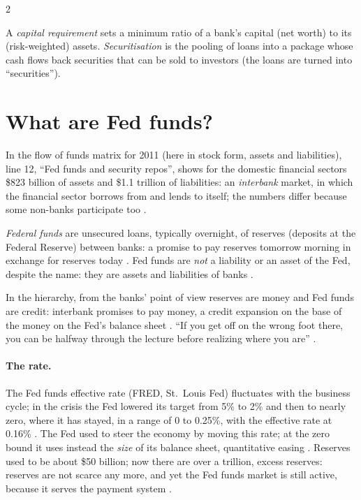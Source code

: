 \begin{paracol}{2}
\begin{definition}
A \emph{capital requirement} sets a minimum ratio of a bank's capital (net worth) to its (risk-weighted) assets. \emph{Securitisation} is the pooling
of loans into a package whose cash flows back securities that can be sold to investors (the loans are turned into ``securities'').
\end{definition}

\section{What are Fed funds?}\label{sec:ff-what}

In the flow of funds matrix for 2011 (here in stock form, assets and liabilities), line 12, ``Fed funds and security repos'', shows for the
domestic financial sectors \$823 billion of assets and \$1.1 trillion of liabilities: an \emph{interbank} market, in which the financial sector
borrows from and lends to itself; the numbers differ because some non-banks participate too .

\begin{definition}\label{def:ff}
\emph{Federal funds} are unsecured loans, typically overnight, of reserves (deposits at the Federal Reserve) between banks: a promise to pay reserves
tomorrow morning in exchange for reserves today . Fed funds are \emph{not} a liability or an asset of the Fed, despite the name: they are
assets and liabilities of banks .
\end{definition}

In the hierarchy, from the banks' point of view reserves are money and Fed funds are credit: interbank promises to pay money, a credit expansion on the
base of the money on the Fed's balance sheet . ``If you get off on the wrong foot there, you can be halfway through the lecture
before realizing where you are'' .

\paragraph{The rate.} The Fed funds effective rate (FRED, St.~Louis Fed) fluctuates with the business cycle; in the crisis the Fed lowered its target from 5\%
to 2\% and then to nearly zero, where it has stayed, in a range of 0 to 0.25\%, with the effective rate at 0.16\% . The
Fed used to steer the economy by moving this rate; at the zero bound it uses instead the \emph{size} of its balance sheet, quantitative easing
. Reserves used to be about \$50 billion; now there are over a trillion, excess reserves: reserves are not scarce any more, and yet the
Fed funds market is still active, because it serves the payment system .


\end{paracol}
